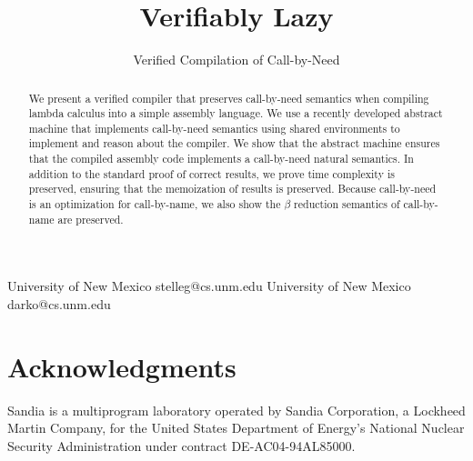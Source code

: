 \documentclass[preprint]{sigplanconf}
\begin{document}
\copyrightdata{[to be supplied]} 


\title{Verifiably Lazy}
\subtitle{Verified Compilation of Call-by-Need}

           {University of New Mexico}
           {stelleg@cs.unm.edu}
           {University of New Mexico}
           {darko@cs.unm.edu}
\maketitle

\begin{abstract}
We present a verified compiler that preserves call-by-need semantics when
compiling lambda calculus into a simple assembly language. We use a recently
developed abstract machine that implements call-by-need semantics using shared
environments to implement and reason about the compiler. We show that the
abstract machine ensures that the compiled assembly code implements a
call-by-need natural semantics. In addition to the standard proof of correct
results, we prove time complexity is preserved, ensuring that the memoization
of results is preserved. Because call-by-need is an optimization for
call-by-name, we also show the $\beta$ reduction semantics of call-by-name are
preserved.
\end{abstract}











\section{Acknowledgments}
Sandia is a multiprogram laboratory operated by Sandia Corporation, a Lockheed Martin Company, for the United States Department of Energy’s National Nuclear Security Administration under contract DE-AC04-94AL85000.



\end{document}
